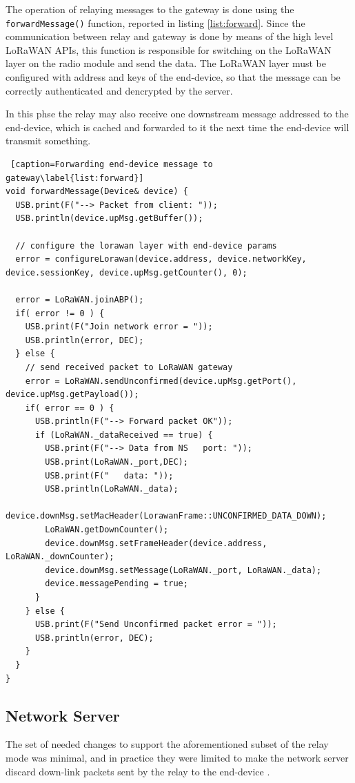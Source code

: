 The operation of relaying messages to the gateway is done using the \texttt{forwardMessage()} function, reported in listing \ref{list:forward}. Since the communication between relay and gateway is done by means of the high level LoRaWAN APIs, this function is responsible for switching on the LoRaWAN layer on the radio module and send the data. The LoRaWAN layer must be configured with address and keys of the end-device, so that the message can be correctly authenticated and dencrypted by the server.

In this phse the relay may also receive one downstream message addressed to the end-device, which is cached and forwarded to it the next time the end-device will transmit something.

\begin{lstlisting} [caption=Forwarding end-device message to gateway\label{list:forward}]
void forwardMessage(Device& device) {
  USB.print(F("--> Packet from client: "));
  USB.println(device.upMsg.getBuffer());
  
  // configure the lorawan layer with end-device params
  error = configureLorawan(device.address, device.networkKey, device.sessionKey, device.upMsg.getCounter(), 0);

  error = LoRaWAN.joinABP();
  if( error != 0 ) {
    USB.print(F("Join network error = ")); 
    USB.println(error, DEC);
  } else {
    // send received packet to LoRaWAN gateway
    error = LoRaWAN.sendUnconfirmed(device.upMsg.getPort(), device.upMsg.getPayload());
    if( error == 0 ) {
      USB.println(F("--> Forward packet OK"));     
      if (LoRaWAN._dataReceived == true) { 
        USB.print(F("--> Data from NS   port: "));
        USB.print(LoRaWAN._port,DEC);
        USB.print(F("   data: "));
        USB.println(LoRaWAN._data);
        device.downMsg.setMacHeader(LorawanFrame::UNCONFIRMED_DATA_DOWN);
        LoRaWAN.getDownCounter();
        device.downMsg.setFrameHeader(device.address, LoRaWAN._downCounter);
        device.downMsg.setMessage(LoRaWAN._port, LoRaWAN._data);
        device.messagePending = true;
      }
    } else {
      USB.print(F("Send Unconfirmed packet error = ")); 
      USB.println(error, DEC);
    }
  }
}
\end{lstlisting}


\subsection{Network Server}
The set of needed changes to support the aforementioned subset of the relay mode was minimal, and in practice they were limited to make the network server discard down-link packets sent by the relay to the end-device . 

